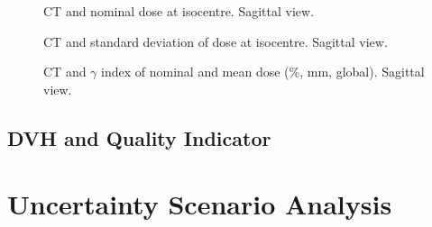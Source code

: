 \documentclass[a4paper]{scrartcl}
\begin{document}
\begin{figure}[!b]
  \centering
  
  \caption{CT and nominal dose at isocentre. Sagittal view.}
\end{figure}

\begin{figure}[!b]
  \centering
  
  \caption{CT and standard deviation of dose at isocentre. Sagittal view.}
\end{figure}

\begin{figure}[!b]
  \centering
  
  \caption{CT and $\gamma$ index of nominal and mean dose (\gammaDoseAgreement \%, \gammaDoseAgreement mm, global). Sagittal view.}
\end{figure}


\FloatBarrier

\newpage
\subsection{DVH and Quality Indicator}
\begin{center}

\end{center}


\FloatBarrier
\newpage
\section{Uncertainty Scenario Analysis}
\label{sec:usa}


\end{document}
